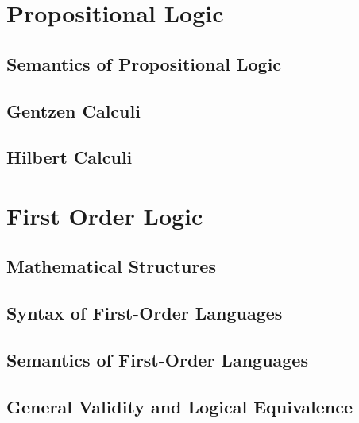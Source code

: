 \section{Propositional Logic}

\subsection{Semantics of Propositional Logic}



\subsection{Gentzen Calculi}



\subsection{Hilbert Calculi}



\vfill\break

\section{First Order Logic}

\subsection{Mathematical Structures}



\subsection{Syntax of First-Order Languages}



\subsection{Semantics of First-Order Languages}



\subsection{General Validity and Logical Equivalence}

